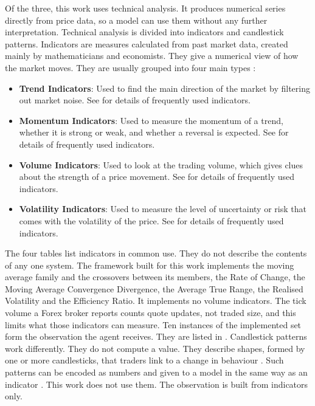 Of the three, this work uses technical analysis. It produces numerical series directly from price data, so a model can use them without any further interpretation. Technical analysis is divided into indicators and candlestick patterns. Indicators are measures calculated from past market data, created mainly by mathematicians and economists. They give a numerical view of how the market moves. They are usually grouped into four main types \cite{lim_handbook_2015}:

\begin{itemize}
\item \textbf{Trend Indicators}: Used to find the main direction of the market by filtering out market noise. See  for details of frequently used indicators.
\item \textbf{Momentum Indicators}: Used to measure the momentum of a trend, whether it is strong or weak, and whether a reversal is expected. See  for details of frequently used indicators.
\item \textbf{Volume Indicators}: Used to look at the trading volume, which gives clues about the strength of a price movement. See  for details of frequently used indicators.
\item \textbf{Volatility Indicators}: Used to measure the level of uncertainty or risk that comes with the volatility of the price. See  for details of frequently used indicators.
\end{itemize}


The four tables list indicators in common use. They do not describe the contents of any one system. The framework built for this work implements the moving average family and the crossovers between its members, the Rate of Change, the Moving Average Convergence Divergence, the Average True Range, the Realised Volatility and the Efficiency Ratio. It implements no volume indicators. The tick volume a Forex broker reports counts quote updates, not traded size, and this limits what those indicators can measure. Ten instances of the implemented set form the observation the agent receives. They are listed in . Candlestick patterns work differently. They do not compute a value. They describe shapes, formed by one or more candlesticks, that traders link to a change in behaviour \cite{rhoads_candlestick_2022}. Such patterns can be encoded as numbers and given to a model in the same way as an indicator \cite{jansen_machine_2020}. This work does not use them. The observation is built from indicators only.

